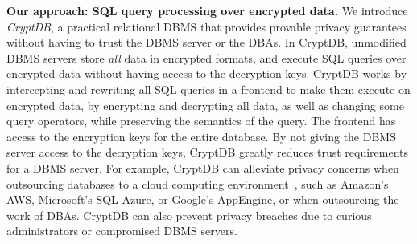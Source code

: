 
{\bf Our approach: SQL query processing over encrypted
  data.}  We introduce {\em CryptDB}, a practical relational DBMS that
provides provable privacy guarantees without having to trust the DBMS
server or the DBAs.  In CryptDB, unmodified DBMS servers store {\em
  all} data in encrypted formats, and execute SQL queries over
encrypted data without having access to the decryption keys.  CryptDB
works by intercepting and rewriting all SQL queries in a frontend to
make them execute on encrypted data, by encrypting and decrypting all
data, as well as changing some query operators, while preserving the
semantics of the query.  The frontend has access to the encryption
keys for the entire database.  By not giving the DBMS server access to
the decryption keys, CryptDB greatly reduces trust requirements for a
DBMS server.  For example, CryptDB can alleviate privacy concerns when
outsourcing databases to a cloud computing
environment~\cite{xeround-blog}, such as Amazon's AWS, Microsoft's SQL
Azure, or Google's AppEngine, or when outsourcing the work of DBAs.
CryptDB can also prevent privacy breaches due to curious
administrators
or compromised DBMS servers.



